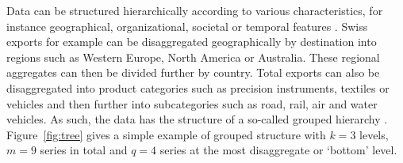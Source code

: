 \documentclass[a4paper,fleqn,11pt]{article}
\begin{document}
Data can be structured hierarchically according to various characteristics, for instance geographical, organizational, societal or temporal features \citep{Kourentzes2019}. Swiss exports for example can be disaggregated geographically by destination into regions such as Western Europe, North America or Australia. These regional aggregates can then be divided further by country. Total exports can also be disaggregated into product categories such as precision instruments, textiles or vehicles and then further into subcategories such as road, rail, air and water vehicles. As such, the data has the structure of a so-called grouped hierarchy \citep[see][and references therein]{Hyndman2018}. Figure~\ref{fig:tree} gives a simple example of grouped structure with $k = 3$ levels, $m = 9$ series in total and $q = 4$ series at the most disaggregate or `bottom' level. 
\end{document}
